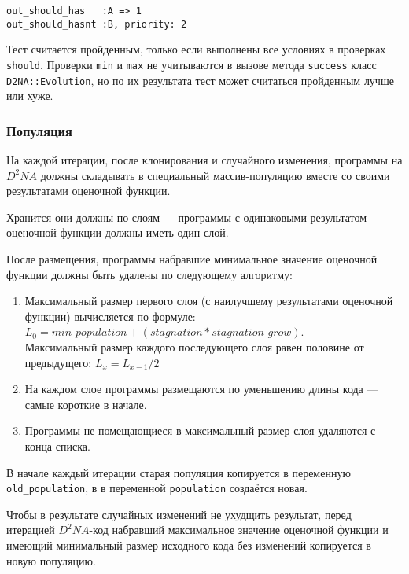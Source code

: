 \documentclass[utf8,a5paper,portrait,12pt]{eskdtext}
\begin{document}
\begin{verbatim}
out_should_has   :A => 1
out_should_hasnt :B, priority: 2
\end{verbatim}

Тест считается пройденным, только если выполнены все условиях в проверках
\texttt{should}. Проверки \texttt{min} и \texttt{max} не учитываются в вызове
метода \texttt{success} класс \texttt{D2NA::Evolution}, но по их результата
тест может считаться пройденным лучше или хуже.

\subsubsection{Популяция}

На каждой итерации, после клонирования и случайного изменения, программы на
$D^2NA$ должны складывать в специальный массив-популяцию вместе со своими
результатами оценочной функции.

Хранится они должны по слоям — программы с одинаковыми результатом оценочной
функции должны иметь один слой.

После размещения, программы набравшие минимальное значение оценочной функции
должны быть удалены по следующему алгоритму:

\begin{enumerate}
  \item Максимальный размер первого слоя (с наилучшему результатами оценочной
        функции) вычисляется по формуле:\\
        $L_0 = min\_population + (stagnation * stagnation\_grow)$.\\
        Максимальный размер каждого последующего слоя равен половине от
        предыдущего: $L_{x} = L_{x-1} / 2$
  \item На каждом слое программы размещаются по уменьшению длины кода — самые
        короткие в начале.
  \item Программы не помещающиеся в максимальный размер слоя удаляются с конца
        списка.
\end{enumerate}

В начале каждый итерации старая популяция копируется в переменную
\texttt{old\_population}, в в переменной \texttt{population} создаётся новая.

Чтобы в результате случайных изменений не ухудщить результат, перед итерацией
$D^2NA$-код набравший максимальное значение оценочной функции и имеющий
минимальный размер исходного кода без изменений копируется в новую популяцию.
\end{document}
